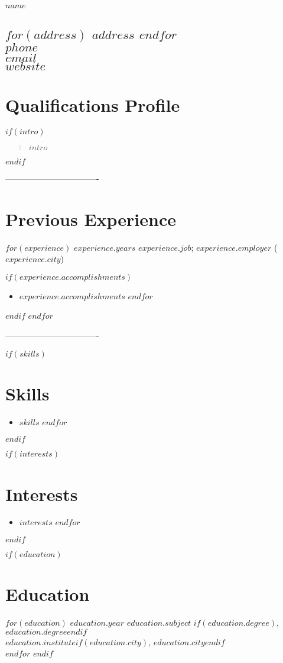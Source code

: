\documentclass[$fontsize$, a4paper]{article}
\begin{document}
{\Huge $name$}
\vspace{-10pt}

\subsection*{
$for(address)$
$address$ 
$endfor$\\
$phone$ \\
\href{mailto:$email$}{$email$} \\
\href{url:$website$}{$website$}}
\vspace{5pt}

\section*{Qualifications Profile}
\vspace{-5pt}
$if(intro)$
\begin{quote}
{$intro$}
\end{quote}
$endif$

\centerline{----------------------------------}

\section*{Previous Experience}
\noindent
$for(experience)$
{\large $experience.years$}
\emph{$experience.job$};
\textsc{$experience.employer$} ($experience.city$)


$if(experience.accomplishments)$
\begin{itemize}
    $for(experience.accomplishments)$
      \item $experience.accomplishments$
    $endfor$
\end{itemize}
$endif$
$endfor$

\centerline{----------------------------------}

$if(skills)$
\section*{Skills}
\begin{itemize}
    $for(skills)$
      \item $skills$
    $endfor$
\end{itemize}
$endif$

$if(interests)$
\section*{Interests}
\begin{itemize}
    $for(interests)$
      \item $interests$
    $endfor$
\end{itemize}
$endif$


$if(education)$
\section*{Education}
\noindent
$for(education)$
\textsc{\large $education.year$}
\textbf{$education.subject$}
$if(education.degree)$, $education.degree$$endif$\\
\emph{$education.institute$}$if(education.city)$, $education.city$$endif$\\[.2cm]
$endfor$
$endif$
\end{document}
